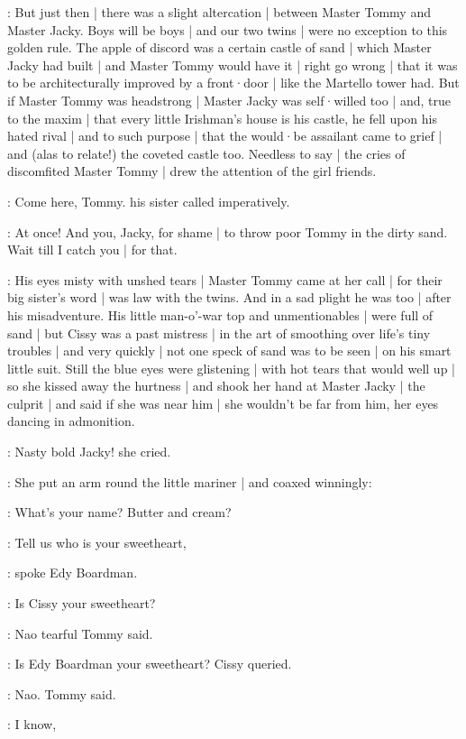 :
But just then |
there was a slight altercation |%
between Master Tommy and Master Jacky.
Boys will be boys |
and our two twins |
were no exception to this golden rule.
The apple of discord was a certain castle of sand |
which Master Jacky had built |
and Master Tommy would have it |
right go wrong |
that it was to be architecturally improved
by a front·door |
like the Martello tower had.
But if Master Tommy was headstrong |
Master Jacky was self·willed too |
and,
true to the maxim |
that every little Irishman's house is his castle,
he fell upon his hated rival |
and to such purpose |
that the would·be assailant came to grief |
and
(alas to relate!)
the coveted castle too.
Needless to say |
the cries of discomfited Master Tommy |
drew the attention of the girl friends.%

\cissy:
Come here,
Tommy.
his sister called imperatively.

\cissy:
At once!
And you,
Jacky,
for shame |
to throw poor Tommy in the dirty sand.
Wait till I catch you |
for that.

:
His eyes misty with unshed tears |
Master Tommy came at her call |
for their big sister's word |
was law with the twins.
And in a sad plight he was too |
after his misadventure.
His little man-o'-war top and unmentionables |
were full of sand |
but Cissy was a past mistress |
in the art of smoothing over life's tiny troubles |
and very quickly |
not one speck of sand was to be seen |
on his smart little suit.
Still the blue eyes were glistening |
with hot tears that would well up |
so she kissed away
the hurtness |
and shook her hand at Master Jacky |
the culprit |
and said if she was near him |
she wouldn't be far from him,
her eyes dancing in admonition.

\cissy:
Nasty bold Jacky!
she cried.

:
She put an arm round the little mariner |
and coaxed winningly:

\cissy:
What's your name?
Butter and cream?

\edy:
Tell us who is your sweetheart,

:
spoke Edy Boardman.

\edy:
Is Cissy your sweetheart?

\tommy:
Nao
\stage{[tearfully]}
tearful Tommy said.

\cissy:
Is Edy Boardman your sweetheart?
Cissy queried.

\tommy:
Nao.
Tommy said.

\edy:
I know,

